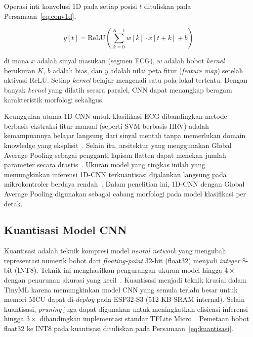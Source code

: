 Operasi inti konvolusi 1D pada setiap posisi $t$ dituliskan pada Persamaan~\ref{eq:conv1d}.

\begin{equation}
\label{eq:conv1d}
y[t] = \text{ReLU}\!\left(\sum_{k=0}^{K-1} w[k] \cdot x[t+k] + b\right)
\end{equation}

di mana $x$ adalah sinyal masukan (segmen ECG), $w$ adalah bobot
\textit{kernel} berukuran $K$, $b$ adalah bias, dan $y$ adalah nilai peta
fitur (\textit{feature map}) setelah aktivasi ReLU. Setiap \textit{kernel}
belajar mengenali satu pola lokal tertentu. Dengan banyak \textit{kernel}
yang dilatih secara paralel, CNN dapat menangkap beragam karakteristik
morfologi sekaligus.

Keunggulan utama 1D-CNN untuk klasifikasi ECG dibandingkan metode
berbasis ekstraksi fitur manual (seperti SVM berbasis HRV) adalah
kemampuannya belajar langsung dari sinyal mentah tanpa memerlukan domain
knowledge yang eksplisit~\cite{mekhfioui_2025}. Selain itu, arsitektur yang menggunakan Global Average Pooling sebagai pengganti
lapisan flatten dapat menekan jumlah parameter secara drastis~\cite{mekhfioui_2025}.
Ukuran model yang ringkas inilah yang memungkinkan inferensi 1D-CNN terkuantisasi
dijalankan langsung pada mikrokontroler berdaya rendah~\cite{kim_2023}. Dalam
penelitian ini, 1D-CNN dengan Global Average Pooling digunakan sebagai cabang
morfologi pada model klasifikasi per detak.

\subsection{Kuantisasi Model CNN}
\label{subsec:kuantisasi}

Kuantisasi adalah teknik kompresi model \textit{neural network} yang mengubah
representasi numerik bobot dari \textit{floating-point} 32-bit (float32) menjadi
\textit{integer} 8-bit (INT8). Teknik ini menghasilkan pengurangan ukuran model
hingga $4\times$ dengan penurunan akurasi yang kecil~\cite{jacob_2018}. Kuantisasi menjadi teknik krusial dalam
TinyML karena memungkinkan model CNN yang semula terlalu besar untuk memori
MCU dapat di-\textit{deploy} pada ESP32-S3 (512 KB SRAM internal). Selain kuantisasi,
\textit{pruning} juga dapat digunakan untuk meningkatkan efisiensi inferensi
hingga $3\times$ dibandingkan implementasi standar TFLite
Micro~\cite{crespi_2026}. Pemetaan bobot float32 ke INT8 pada kuantisasi
dituliskan pada Persamaan~\ref{eq:kuantisasi}.


